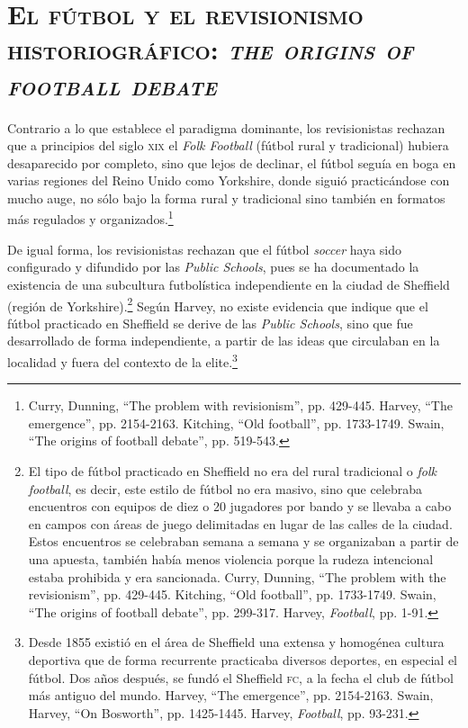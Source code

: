 \documentclass[11pt,a5paper,twoside]{book} %
\begin{document}
\section*{\mdseries\large\textsc{El fútbol y el revisionismo historiográfico: \textit{the origins of football debate}}}

\noindent Contrario a lo que establece el paradigma dominante, los revisionistas rechazan que a
principios del siglo \textsc{xix} el \emph{Folk Football} (fútbol rural y tradicional) hubiera desaparecido
por completo, sino que lejos de declinar, el fútbol seguía en boga en varias regiones del Reino
Unido como Yorkshire, donde siguió practicándose con mucho auge, no sólo bajo la forma
rural y tradicional sino también en formatos más regulados y organizados.\footnote{Curry, Dunning, ``The problem with revisionism'', pp. 429-445. Harvey, ``The emergence'', pp. 2154-2163. Kitching, ``Old football'', pp. 1733-1749. Swain, ``The origins of football debate'', pp. 519-543.}

De igual forma, los revisionistas rechazan que el fútbol \emph{soccer} haya sido configurado
y difundido por las \emph{Public Schools}, pues se ha documentado la existencia de una subcultura
futbolística independiente en la ciudad de Sheffield (región de Yorkshire).\footnote{El tipo de fútbol practicado en Sheffield no era del rural tradicional o \emph{folk football}, es decir, este estilo de fútbol no era masivo, sino que celebraba encuentros con equipos de diez o 20 jugadores por bando y se llevaba a cabo en campos con áreas de juego delimitadas en lugar de las calles de la ciudad. Estos encuentros se celebraban semana a semana y se organizaban a partir de una apuesta, también había menos violencia porque la rudeza intencional estaba prohibida y era sancionada. Curry, Dunning, ``The problem with the revisionism'', pp. 429-445. Kitching, ``Old football'', pp. 1733-1749. Swain, ``The origins of football debate'', pp. 299-317. Harvey, \emph{Football}, pp. 1-91.} Según Harvey,
no existe evidencia que indique que el fútbol practicado en Sheffield se derive de las \emph{Public
Schools}, sino que fue desarrollado de forma independiente, a partir de las ideas que
circulaban en la localidad y fuera del contexto de la elite.\footnote{Desde 1855 existió en el área de Sheffield una extensa y homogénea cultura deportiva que de forma recurrente practicaba diversos deportes, en especial el fútbol. Dos años después, se fundó el Sheffield \textsc{fc}, a la fecha el club de fútbol más antiguo del mundo. Harvey, ``The emergence'', pp. 2154-2163. Swain, Harvey, ``On Bosworth'', pp. 1425-1445. Harvey, \emph{Football}, pp. 93-231.}
\end{document}
